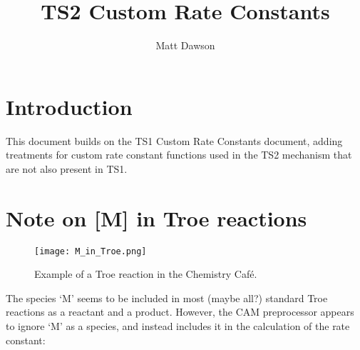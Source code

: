 \documentclass[titlepage]{article}
\begin{document}
\title{TS2 Custom Rate Constants}
\author{Matt Dawson}
\maketitle


\section{Introduction}

This document builds on the TS1 Custom Rate Constants document, adding treatments for custom rate constant
functions used in the TS2 mechanism that are not also present in TS1.



\section{Note on [M] in Troe reactions}

\begin{figure}[h]
\centerline{\texttt{[image: M\_in\_Troe.png]}}
\caption{Example of a Troe reaction in the Chemistry Caf\'{e}.}
\label{fig:TroeM}
\end{figure}

The species `M' seems to be included in most (maybe all?) standard Troe reactions as a reactant and a product.
However, the CAM preprocessor appears to ignore `M' as a species, and instead includes it in the calculation of the
rate constant:
\end{document}
